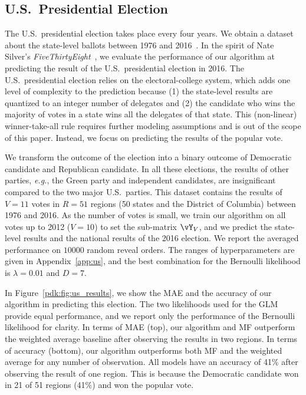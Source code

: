 \subsection{U.S.\ Presidential Election}

The U.S.\ presidential election takes place every four years.
We obtain a dataset about the state-level ballots between 1976 and 2016~\citep{mit2017us}.
In the spirit of Nate Silver's \textit{FiveThirtyEight}~\citep{silver2008pollster}, we evaluate the performance of our algorithm at predicting the result of the U.S.\ presidential election in 2016.
The U.S.\ presidential election relies on the electoral-college system, which adds one level of complexity to the prediction because (1) the state-level results are quantized to an integer number of delegates and (2) the candidate who wins the majority of votes in a state wins all the delegates of that state.
This (non-linear) winner-take-all rule requires further modeling assumptions and is out of the scope of this paper.
Instead, we focus on predicting the results of the popular vote.

We transform the outcome of the election into a binary outcome of Democratic candidate and Republican candidate.
In all these elections, the results of other parties, \textit{e.g.}, the Green party and independent candidates, are insignificant compared to the two major U.S.\ parties.
This dataset contains the results of $V = 11$ votes in $R = 51$ regions (50 states and the District of Columbia) between 1976 and 2016.
As the number of votes is small, we train our algorithm on all votes up to 2012 ($V = 10$) to set the sub-matrix $\vY_V$, and we predict the state-level results and the national results of the 2016 election.
We report the averaged performance on $10000$ random reveal orders.
The ranges of hyperparameters are given in Appendix~\ref{app:us}, and the best combination for the Bernoulli likelihood is $\lambda = 0.01 $ and $D = 7$.

In Figure~\ref{pdk:fig:us_results}, we show the MAE and the accuracy of our algorithm in predicting this election.
The two likelihoods used for the GLM provide equal performance, and we report only the performance of the Bernoulli likelihood for clarity.
In terms of MAE (top), our algorithm and MF outperform the weighted average baseline after observing the results in two regions.
In terms of accuracy (bottom), our algorithm outperforms both MF and the weighted average for any number of observation.
All models have an accuracy of 41\% after observing the result of one region.
This is because the Democratic candidate won in 21 of 51 regions (41\%) and won the popular vote.

